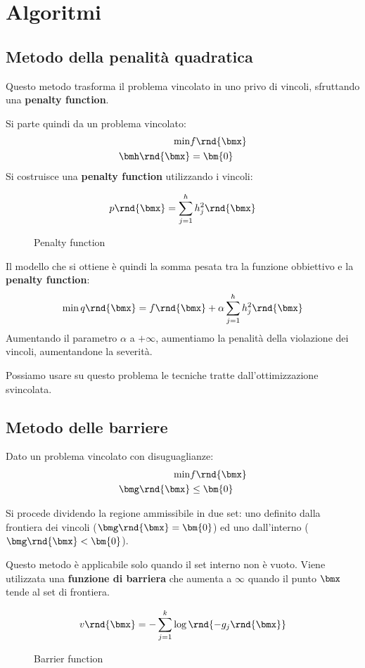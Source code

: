 \documentclass[\main/main.tex]{subfiles}
\begin{document}
\chapter{Algoritmi}
\section{Metodo della penalità quadratica}
Questo metodo trasforma il problema vincolato in uno privo di vincoli, sfruttando una \textbf{penalty function}.

Si parte quindi da un problema vincolato:
\begin{align*}
    \min &f\rnd{\bmx}\\
    \bmh\rnd{\bmx} &= \bm{0}
\end{align*}
Si costruisce una \textbf{penalty function} utilizzando i vincoli:

\begin{figure}
    \[
        p\rnd{\bmx} = \sum_{j=1}^h h_j^2\rnd{\bmx}
    \]    \caption{Penalty function}
\end{figure}

Il modello che si ottiene è quindi la somma pesata tra la funzione obbiettivo e la \textbf{penalty function}:
\[
    \min q\rnd{\bmx} = f\rnd{\bmx} + \alpha\sum_{j=1}^h h_j^2\rnd{\bmx}
\]
Aumentando il parametro \(\alpha \) a \(+\infty \), aumentiamo la penalità della violazione dei vincoli, aumentandone la severità.

Possiamo usare su questo problema le tecniche tratte dall'ottimizzazione svincolata.

\clearpage
\section{Metodo delle barriere}
Dato un problema vincolato con disuguaglianze:
\begin{align*}
    \min &f\rnd{\bmx}\\
    \bmg\rnd{\bmx} &\leq \bm{0}
\end{align*}

Si procede dividendo la regione ammissibile in due set: uno definito dalla frontiera dei vincoli (\(\bmg\rnd{\bmx} = \bm{0}\)) ed uno dall'interno (\(\bmg\rnd{\bmx} < \bm{0}\)).

Questo metodo è applicabile solo quando il set interno non è vuoto. Viene utilizzata una \textbf{funzione di barriera} che aumenta a \(\infty \) quando il punto \(\bmx \) tende al set di frontiera.

\begin{figure}
    \[
        v\rnd{\bmx} = -\sum_{j=1}^k \log\rnd{-g_j\rnd{\bmx}}
    \]    \caption{Barrier function}
\end{figure}
\end{document}

